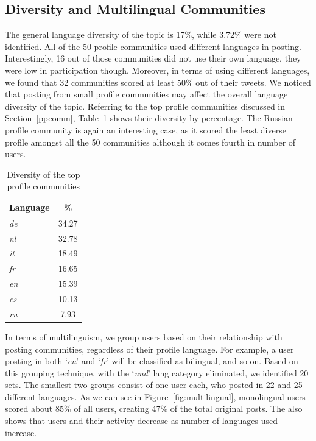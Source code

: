 \subsection{Diversity and Multilingual Communities}

  The general
language diversity of the topic is 17\%, while 3.72\% were not
identified. All of the 50 profile communities used different languages
in posting. Interestingly, 16 out of those communities did not use
their own language, they were low in participation though. Moreover,
in terms of using different languages, we found that 32 communities
scored at least 50\% out of their tweets. We noticed that posting from
small profile communities may affect the overall language diversity of
the topic. Referring to the top profile communities discussed in
Section~\ref{ppcomm}, Table~\ref{tbl:diversity} shows their
diversity by percentage. The Russian profile community is again an
interesting case, as it scored the least diverse profile amongst all
the 50 communities although it comes fourth in number of users.

\begin{table}[!htb]
\centering
\begin{tabular}{@{}lc}
\toprule
\textbf{Language} & \textbf{\%} \\ 
\midrule
{\emph{de}} & 34.27 \\
{\emph{nl}} & 32.78 \\
{\emph{it}} & 18.49 \\ 
{\emph{fr}} & 16.65 \\
{\emph{en}} & 15.39 \\
{\emph{es}} & 10.13 \\
{\emph{ru}} & 7.93 \\
\bottomrule
\end{tabular}
\caption{Diversity of the top profile communities}
\label{tbl:diversity}
\end{table}


In terms of multilinguism, we group users based on their relationship with
posting communities, regardless of their profile language. For
example, a user posting in both `{\emph{en}}' and `{\emph{fr}}' will
be classified as bilingual, and so on. Based on this grouping
technique, with the `{\emph{und}}' lang category eliminated, we
identified 20 sets. The smallest two groups consist of one user each,
who posted in 22 and 25 different languages.  As we can see in
Figure~\ref{fig:multilingual}, monolingual users scored about 85\% of
all users, creating 47\% of the total original posts. The also shows
that users and their activity decrease as number of languages used
increase.

